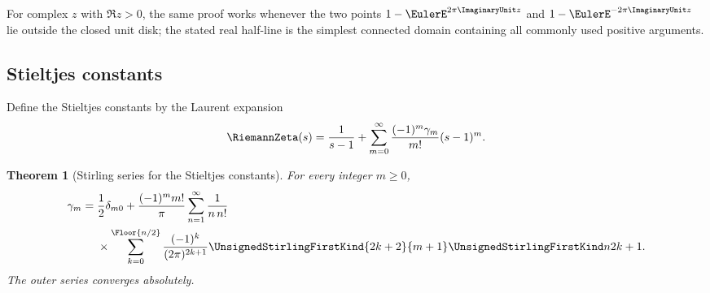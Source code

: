 \documentclass[11pt,a4paper,oneside,openany]{book}
\newtheorem{theorem}{Theorem}[chapter]
\theoremstyle{definition}
\theoremstyle{remark}
\begin{document}
For complex $z$ with $\Re z>0$, the same proof works whenever the two points
$1-\EulerE^{2\pi \ImaginaryUnit z}$ and $1-\EulerE^{-2\pi \ImaginaryUnit z}$ lie outside the closed unit disk; the stated
real half-line is the simplest connected domain containing all commonly used
positive arguments.

\subsection{Stieltjes constants}
Define the Stieltjes constants by the Laurent expansion
\begin{equation}
\label{eq:stieltjes-definition}
 \RiemannZeta(s)=\frac1{s-1}+\sum_{m=0}^{\infty}
 \frac{(-1)^m\gamma_m}{m!}(s-1)^m.
\end{equation}

\begin{theorem}[Stirling series for the Stieltjes constants]
\label{thm:stieltjes-stirling-series}
For every integer $m\ge0$,
\begin{equation}
\label{eq:stieltjes-stirling-series}
\begin{aligned}
 \gamma_m={}&\frac12\delta_{m0}
 +\frac{(-1)^m m!}{\pi}
 \sum_{n=1}^{\infty}\frac1{n\,n!}\\
 &\times\sum_{k=0}^{\Floor{n/2}}
 \frac{(-1)^k}{(2\pi)^{2k+1}}
 \UnsignedStirlingFirstKind{2k+2}{m+1}\UnsignedStirlingFirstKind n{2k+1}.
\end{aligned}
\end{equation}
The outer series converges absolutely.
\end{theorem}
\end{document}
